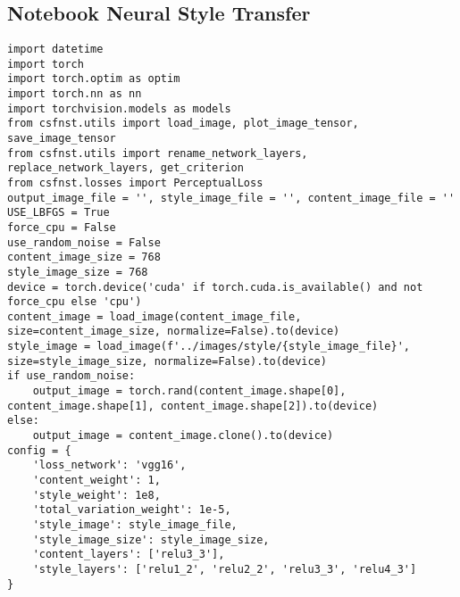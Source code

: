 \appendix
\chapter{}

\section{Notebook Neural Style Transfer}
\label{sec:nootebook_neural_style_transfer}
\begin{listing}[H]
\begin{verbatim}
import datetime
import torch
import torch.optim as optim
import torch.nn as nn
import torchvision.models as models
from csfnst.utils import load_image, plot_image_tensor, save_image_tensor
from csfnst.utils import rename_network_layers, replace_network_layers, get_criterion
from csfnst.losses import PerceptualLoss
output_image_file = '', style_image_file = '', content_image_file = ''
USE_LBFGS = True
force_cpu = False
use_random_noise = False
content_image_size = 768
style_image_size = 768
device = torch.device('cuda' if torch.cuda.is_available() and not force_cpu else 'cpu')
content_image = load_image(content_image_file, size=content_image_size, normalize=False).to(device)
style_image = load_image(f'../images/style/{style_image_file}', size=style_image_size, normalize=False).to(device)
if use_random_noise:
    output_image = torch.rand(content_image.shape[0], content_image.shape[1], content_image.shape[2]).to(device)
else:
    output_image = content_image.clone().to(device)
config = {
    'loss_network': 'vgg16',
    'content_weight': 1,
    'style_weight': 1e8,
    'total_variation_weight': 1e-5,
    'style_image': style_image_file,
    'style_image_size': style_image_size,
    'content_layers': ['relu3_3'],
    'style_layers': ['relu1_2', 'relu2_2', 'relu3_3', 'relu4_3']
}
\end{verbatim}
\label{lst:notebook_neural_style_transfer_1}
\end{listing}

